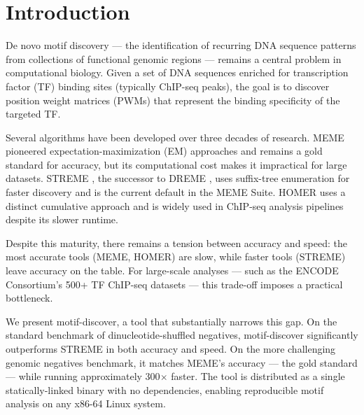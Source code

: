 \section{Introduction}
\label{sec:intro}

De novo motif discovery --- the identification of recurring DNA sequence patterns from collections of functional genomic regions --- remains a central problem in computational biology. Given a set of DNA sequences enriched for transcription factor (TF) binding sites (typically ChIP-seq peaks), the goal is to discover position weight matrices (PWMs) that represent the binding specificity of the targeted TF.

Several algorithms have been developed over three decades of research. MEME \citep{bailey1994meme} pioneered expectation-maximization (EM) approaches and remains a gold standard for accuracy, but its computational cost makes it impractical for large datasets. STREME \citep{bailey2021streme}, the successor to DREME \citep{bailey2011dreme}, uses suffix-tree enumeration for faster discovery and is the current default in the MEME Suite. HOMER \citep{heinz2010homer} uses a distinct cumulative approach and is widely used in ChIP-seq analysis pipelines despite its slower runtime.

Despite this maturity, there remains a tension between accuracy and speed: the most accurate tools (MEME, HOMER) are slow, while faster tools (STREME) leave accuracy on the table. For large-scale analyses --- such as the ENCODE Consortium's \citep{encode2012} 500+ TF ChIP-seq datasets --- this trade-off imposes a practical bottleneck.

We present motif-discover, a tool that substantially narrows this gap. On the standard benchmark of dinucleotide-shuffled negatives, motif-discover significantly outperforms STREME in both accuracy and speed. On the more challenging genomic negatives benchmark, it matches MEME's accuracy --- the gold standard --- while running approximately 300$\times$ faster. The tool is distributed as a single statically-linked binary with no dependencies, enabling reproducible motif analysis on any x86-64 Linux system.
